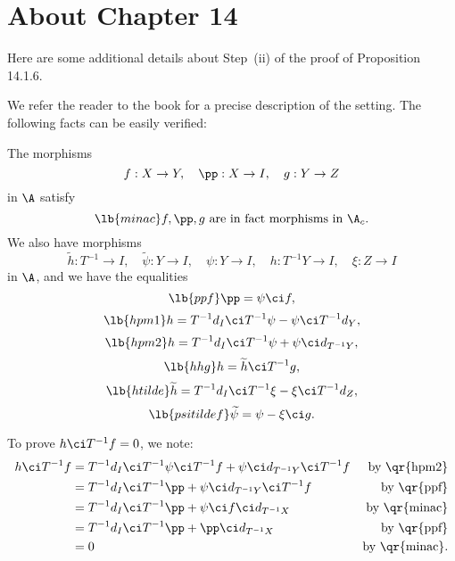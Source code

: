 \documentclass[12pt]{article}
\theoremstyle{remark}
\theoremstyle{definition}
\begin{document}

\section{About Chapter 14}


Here are some additional details about Step~(ii) of the proof of Proposition 14.1.6. 

We refer the reader to the book for a precise description of the setting. The following facts can be easily verified: 

The morphisms 
$$
f:X\to Y,\quad\pp:X\to I,\quad g:Y\to Z
$$ 
in $\A$ satisfy 
\begin{equation}\lb{minac}
f,\pp,g\text{ are in fact morphisms in }\A_c.
\end{equation}
We also have morphisms 
$$
\widetilde h:T^{-1}\to I,\quad\widetilde\psi:Y\to I,\quad\psi:Y\to I,\quad h:T^{-1}Y\to I,\quad\xi:Z\to I
$$ 
in $\A$, and we have the equalities 
\begin{equation}\lb{ppf}
\pp=\psi\ci f,
\end{equation} 
\begin{equation}\lb{hpm1}
h=T^{-1}d_I\ci T^{-1}\psi-\psi\ci T^{-1}d_Y,
\end{equation} 
\begin{equation}\lb{hpm2}
h=T^{-1}d_I\ci T^{-1}\psi+\psi\ci d_{T^{-1}Y},
\end{equation} 
\begin{equation}\lb{hhg}
h=\widetilde h\ci T^{-1}g,
\end{equation} 
\begin{equation}\lb{htilde}
\widetilde h=T^{-1}d_I\ci T^{-1}\xi-\xi\ci T^{-1}d_Z,
\end{equation} 
\begin{equation}\lb{psitildef}
\widetilde\psi=\psi-\xi\ci g. 
\end{equation}

To prove $h\ci T^{-1}f=0$, we note: 
\begin{align*}
h\ci T^{-1}f&=T^{-1}d_I\ci T^{-1}\psi\ci T^{-1}f+\psi\ci d_{T^{-1}Y}\ci T^{-1}f&\text{by \qr{hpm2}}\\ 
&=T^{-1}d_I\ci T^{-1}\pp+\psi\ci d_{T^{-1}Y}\ci T^{-1}f&\text{by \qr{ppf}}\\ 
&=T^{-1}d_I\ci T^{-1}\pp+\psi\ci f\ci d_{T^{-1}X}&\text{by \qr{minac}}\\ 
&=T^{-1}d_I\ci T^{-1}\pp+\pp\ci d_{T^{-1}X}&\text{by \qr{ppf}}\\ 
&=0&\text{by \qr{minac}}. 
\end{align*}
\end{document}
